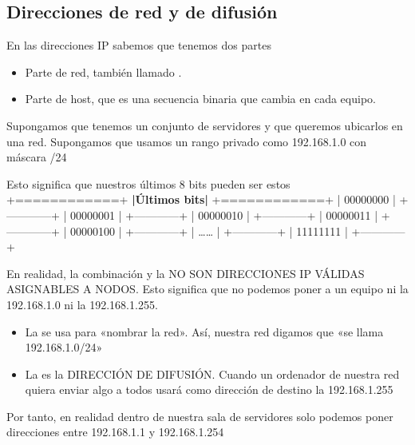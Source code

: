 \documentclass[letterpaper,10pt,spanish]{sphinxmanual}
\begin{document}
\subsection{Direcciones de red y de difusión}
\label{\detokenize{t2_integracion_elementos/apuntes_t2:direcciones-de-red-y-de-difusion}}
\sphinxAtStartPar
En las direcciones IP sabemos que tenemos dos partes
\begin{itemize}
\item {} 
\sphinxAtStartPar
Parte de red, también llamado .

\item {} 
\sphinxAtStartPar
Parte de host, que es una secuencia binaria que cambia en cada equipo.

\end{itemize}

\sphinxAtStartPar
Supongamos que tenemos un conjunto de servidores y que queremos ubicarlos en una red. Supongamos que usamos un rango privado como 192.168.1.0 con máscara /24

\sphinxAtStartPar
Esto significa que nuestros últimos 8 bits pueden ser estos
+============+
{\color{red}\bfseries{}|Últimos bits|}
+============+
|  00000000  |
+————+
|  00000001  |
+————+
|  00000010  |
+————+
|  00000011  |
+————+
|  00000100  |
+————+
|   ……   |
+————+
|   11111111 |
+————+

\sphinxAtStartPar
En realidad, la combinación  y la  NO SON DIRECCIONES IP VÁLIDAS ASIGNABLES A NODOS. Esto significa que no podemos poner a un equipo ni la 192.168.1.0 ni la 192.168.1.255. 
\begin{itemize}
\item {} 
\sphinxAtStartPar
La  se usa para «nombrar la red». Así, nuestra red digamos que «se llama 192.168.1.0/24»

\item {} 
\sphinxAtStartPar
La  es la DIRECCIÓN DE DIFUSIÓN. Cuando un ordenador de nuestra red quiera enviar algo a todos usará como dirección de destino la 192.168.1.255

\end{itemize}

\sphinxAtStartPar
Por tanto, en realidad dentro de nuestra sala de servidores solo podemos poner direcciones entre 192.168.1.1 y 192.168.1.254
\end{document}
